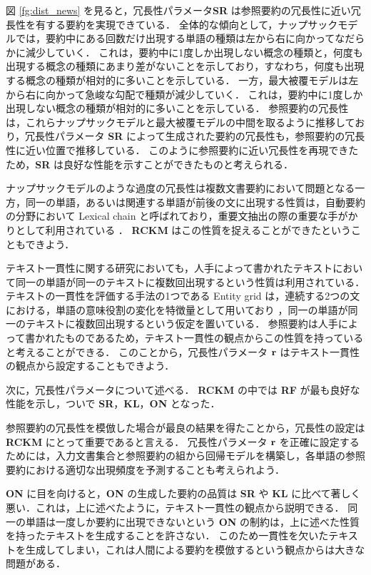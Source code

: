 \documentclass[japanese]{jnlp_1.4}
\begin{document}
図 \ref{fg:dist_news} を見ると，冗長性パラメータ{\bf SR} は参照要約の冗長性に近い冗長性を有する要約を実現できている．
全体的な傾向として，ナップサックモデルでは，要約中にある回数だけ出現する単語の種類は左から右に向かってなだらかに減少していく．
これは，要約中に1度しか出現しない概念の種類と，何度も出現する概念の種類にあまり差がないことを示しており，すなわち，何度も出現する概念の種類が相対的に多いことを示している．
一方，最大被覆モデルは左から右に向かって急峻な勾配で種類が減少していく．
これは，要約中に1度しか出現しない概念の種類が相対的に多いことを示している．
参照要約の冗長性は，これらナップサックモデルと最大被覆モデルの中間を取るように推移しており，冗長性パラメータ {\bf SR} によって生成された要約の冗長性も，参照要約の冗長性に近い位置で推移している．
このように参照要約に近い冗長性を再現できたため，{\bf SR} は良好な性能を示すことができたものと考えられる．

ナップサックモデルのような過度の冗長性は複数文書要約において問題となる一方，同一の単語，あるいは関連する単語が前後の文に出現する性質は，自動要約の分野において Lexical chain と呼ばれており，重要文抽出の際の重要な手がかりとして利用されている \cite{barzilay97,clarke07}．
{\bf RCKM } はこの性質を捉えることができたということもできよう．

テキスト一貫性に関する研究においても，人手によって書かれたテキストにおいて同一の単語が同一のテキストに複数回出現するという性質は利用されている．
テキストの一貫性を評価する手法の1つである Entity grid は，連続する2つの文における，単語の意味役割の変化を特徴量として用いており \cite{barzilay05,barzilay08,yokono10}，同一の単語が同一のテキストに複数回出現するという仮定を置いている．
参照要約は人手によって書かれたものであるため，テキスト一貫性の観点からこの性質を持っていると考えることができる．
このことから，冗長性パラメータ $ {\bf r} $ はテキスト一貫性の観点から設定することもできよう．

次に，冗長性パラメータについて述べる．
{\bf RCKM} の中では {\bf RF} が最も良好な性能を示し，ついで {\bf SR}，{\bf KL}，{\bf ON} となった．

参照要約の冗長性を模倣した場合が最良の結果を得たことから，冗長性の設定は {\bf RCKM } にとって重要であると言える．
冗長性パラメータ $ {\bf r } $ を正確に設定するためには，入力文書集合と参照要約の組から回帰モデルを構築し，各単語の参照要約における適切な出現頻度を予測することも考えられよう．

{\bf ON} に目を向けると，{\bf ON} の生成した要約の品質は {\bf SR} や {\bf KL} に比べて著しく悪い．これは，上に述べたように，テキスト一貫性の観点から説明できる．
同一の単語は一度しか要約に出現できないという {\bf ON} の制約は，上に述べた性質を持ったテキストを生成することを許さない．
このため一貫性を欠いたテキストを生成してしまい，これは人間による要約を模倣するという観点からは大きな問題がある．
\end{document}
